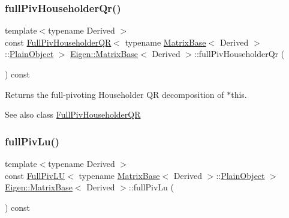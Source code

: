 \subsubsection{\texorpdfstring{fullPivHouseholderQr()}{fullPivHouseholderQr()}}
{\footnotesize\ttfamily template$<$typename Derived $>$ \\
const \mbox{\hyperlink{class_eigen_1_1_full_piv_householder_q_r}{Full\+Piv\+Householder\+QR}}$<$ typename \mbox{\hyperlink{class_eigen_1_1_matrix_base}{Matrix\+Base}}$<$ Derived $>$\+::\mbox{\hyperlink{class_eigen_1_1_dense_base_aae45af9b5aca5a9caae98fd201f47cc4}{Plain\+Object}} $>$ \mbox{\hyperlink{class_eigen_1_1_matrix_base}{Eigen\+::\+Matrix\+Base}}$<$ Derived $>$\+::full\+Piv\+Householder\+Qr (\begin{DoxyParamCaption}{ }\end{DoxyParamCaption}) const\hspace{0.3cm}{\ttfamily [inline]}}

\begin{DoxyReturn}{Returns}
the full-\/pivoting Householder QR decomposition of {\ttfamily $\ast$this}.
\end{DoxyReturn}
\begin{DoxySeeAlso}{See also}
class \mbox{\hyperlink{class_eigen_1_1_full_piv_householder_q_r}{Full\+Piv\+Householder\+QR}} 
\end{DoxySeeAlso}
\mbox{\label{class_eigen_1_1_matrix_base_a25da97d31acab0ee5d9d13bdbb0569da}} 
\subsubsection{\texorpdfstring{fullPivLu()}{fullPivLu()}}
{\footnotesize\ttfamily template$<$typename Derived $>$ \\
const \mbox{\hyperlink{class_eigen_1_1_full_piv_l_u}{Full\+Piv\+LU}}$<$ typename \mbox{\hyperlink{class_eigen_1_1_matrix_base}{Matrix\+Base}}$<$ Derived $>$\+::\mbox{\hyperlink{class_eigen_1_1_dense_base_aae45af9b5aca5a9caae98fd201f47cc4}{Plain\+Object}} $>$ \mbox{\hyperlink{class_eigen_1_1_matrix_base}{Eigen\+::\+Matrix\+Base}}$<$ Derived $>$\+::full\+Piv\+Lu (\begin{DoxyParamCaption}{ }\end{DoxyParamCaption}) const\hspace{0.3cm}{\ttfamily [inline]}}

